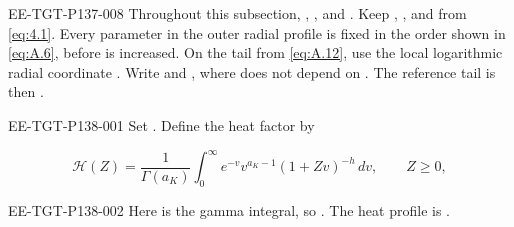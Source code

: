 \begin{EESegment}{EE-TGT-P137-008}
Throughout this subsection, , , and
. Keep ,
, and  from \eqref{eq:4.1}. Every parameter in the
outer radial profile is fixed in the order shown in \eqref{eq:A.6}, before  is increased.
On the tail from \eqref{eq:A.12}, use the local logarithmic radial coordinate
. Write
 and
, where
 does not depend on . The reference tail is then
.
\end{EESegment}

%
\begin{EESegment}{EE-TGT-P138-001}
Set . Define the heat factor by
\end{EESegment}
\begin{equation}
 \mathcal H(Z)=\frac1{\Gamma(a_K)}\int_0^\infty
 e^{-v}v^{a_K-1}(1+Zv)^{-h}\,dv,\qquad Z\geq0,
 \tag{A.32}\label{eq:A.32}
\end{equation}
\begin{EESegment}{EE-TGT-P138-002}
Here  is the gamma integral, so
. The heat profile is
.
\end{EESegment}

